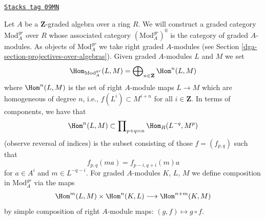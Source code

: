 \begin{example}

\label{dga-example-gm-gr-cat}
\href{https://stacks.math.columbia.edu/tag/09MN}{\texttt{Stacks tag 09MN}}

Let $A$ be a $\mathbf{Z}$-graded algebra over a ring $R$. We will construct
a graded category $\text{Mod}^{gr}_A$ over $R$ whose associated category
$(\text{Mod}^{gr}_A)^0$ is the category of graded $A$-modules. As objects
of $\text{Mod}^{gr}_A$ we take right graded $A$-modules (see
Section \ref{dga-section-projectives-over-algebras}). Given graded
$A$-modules $L$ and $M$ we set
$$
\Hom_{\text{Mod}^{gr}_A}(L, M) =
\bigoplus\nolimits_{n \in \mathbf{Z}} \Hom^n(L, M)
$$
where $\Hom^n(L, M)$ is the set of right $A$-module maps $L \to M$ which
are homogeneous of degree $n$, i.e., $f(L^i) \subset M^{i + n}$ for
all $i \in \mathbf{Z}$. In terms of components, we have that
$$
\Hom^n(L, M) \subset \prod\nolimits_{p + q = n} \Hom_R(L^{-q}, M^p)
$$
(observe reversal of indices) is the subset consisting of those
$f = (f_{p, q})$ such that
$$
f_{p, q}(m a) = f_{p - i, q + i}(m)a
$$
for $a \in A^i$ and $m \in L^{-q - i}$. For graded $A$-modules
$K$, $L$, $M$ we define composition in $\text{Mod}^{gr}_A$ via
the maps
$$
\Hom^m(L, M) \times \Hom^n(K, L) \longrightarrow \Hom^{n + m}(K, M)
$$
by simple composition of right $A$-module maps: $(g, f) \mapsto g \circ f$.
\end{example}

